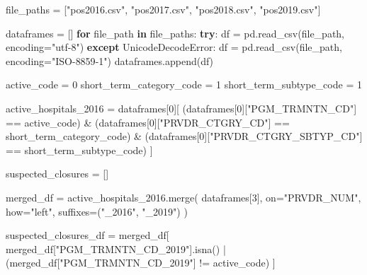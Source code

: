 \documentclass[
  letterpaper,
  DIV=11,
  numbers=noendperiod]{scrartcl}
\newenvironment{Shaded}{\begin{snugshade}}{\end{snugshade}}
\newcommand{\ControlFlowTok}[1]{\textcolor[rgb]{0.00,0.23,0.31}{\textbf{#1}}}
\newcommand{\DecValTok}[1]{\textcolor[rgb]{0.68,0.00,0.00}{#1}}
\newcommand{\KeywordTok}[1]{\textcolor[rgb]{0.00,0.23,0.31}{\textbf{#1}}}
\newcommand{\NormalTok}[1]{\textcolor[rgb]{0.00,0.23,0.31}{#1}}
\newcommand{\OperatorTok}[1]{\textcolor[rgb]{0.37,0.37,0.37}{#1}}
\newcommand{\PreprocessorTok}[1]{\textcolor[rgb]{0.68,0.00,0.00}{#1}}
\newcommand{\StringTok}[1]{\textcolor[rgb]{0.13,0.47,0.30}{#1}}
\begin{document}
\begin{Shaded}
\begin{Highlighting}[]
\NormalTok{file\_paths }\OperatorTok{=}\NormalTok{ [}\StringTok{"pos2016.csv"}\NormalTok{, }\StringTok{"pos2017.csv"}\NormalTok{, }\StringTok{"pos2018.csv"}\NormalTok{, }\StringTok{"pos2019.csv"}\NormalTok{]}

\NormalTok{dataframes }\OperatorTok{=}\NormalTok{ []}
\ControlFlowTok{for}\NormalTok{ file\_path }\KeywordTok{in}\NormalTok{ file\_paths:}
    \ControlFlowTok{try}\NormalTok{:}
\NormalTok{        df }\OperatorTok{=}\NormalTok{ pd.read\_csv(file\_path, encoding}\OperatorTok{=}\StringTok{"utf{-}8"}\NormalTok{)}
    \ControlFlowTok{except} \PreprocessorTok{UnicodeDecodeError}\NormalTok{:}
\NormalTok{        df }\OperatorTok{=}\NormalTok{ pd.read\_csv(file\_path, encoding}\OperatorTok{=}\StringTok{"ISO{-}8859{-}1"}\NormalTok{)}
\NormalTok{    dataframes.append(df)}

\NormalTok{active\_code }\OperatorTok{=} \DecValTok{0}
\NormalTok{short\_term\_category\_code }\OperatorTok{=} \DecValTok{1}
\NormalTok{short\_term\_subtype\_code }\OperatorTok{=} \DecValTok{1}

\NormalTok{active\_hospitals\_2016 }\OperatorTok{=}\NormalTok{ dataframes[}\DecValTok{0}\NormalTok{][}
\NormalTok{    (dataframes[}\DecValTok{0}\NormalTok{][}\StringTok{"PGM\_TRMNTN\_CD"}\NormalTok{] }\OperatorTok{==}\NormalTok{ active\_code)}
    \OperatorTok{\&}\NormalTok{ (dataframes[}\DecValTok{0}\NormalTok{][}\StringTok{"PRVDR\_CTGRY\_CD"}\NormalTok{] }\OperatorTok{==}\NormalTok{ short\_term\_category\_code)}
    \OperatorTok{\&}\NormalTok{ (dataframes[}\DecValTok{0}\NormalTok{][}\StringTok{"PRVDR\_CTGRY\_SBTYP\_CD"}\NormalTok{] }\OperatorTok{==}\NormalTok{ short\_term\_subtype\_code)}
\NormalTok{]}

\NormalTok{suspected\_closures }\OperatorTok{=}\NormalTok{ []}

\NormalTok{merged\_df }\OperatorTok{=}\NormalTok{ active\_hospitals\_2016.merge(}
\NormalTok{    dataframes[}\DecValTok{3}\NormalTok{], on}\OperatorTok{=}\StringTok{"PRVDR\_NUM"}\NormalTok{, how}\OperatorTok{=}\StringTok{"left"}\NormalTok{, suffixes}\OperatorTok{=}\NormalTok{(}\StringTok{"\_2016"}\NormalTok{, }\StringTok{"\_2019"}\NormalTok{)}
\NormalTok{)}

\NormalTok{suspected\_closures\_df }\OperatorTok{=}\NormalTok{ merged\_df[}
\NormalTok{    merged\_df[}\StringTok{"PGM\_TRMNTN\_CD\_2019"}\NormalTok{].isna()}
    \OperatorTok{|}\NormalTok{ (merged\_df[}\StringTok{"PGM\_TRMNTN\_CD\_2019"}\NormalTok{] }\OperatorTok{!=}\NormalTok{ active\_code)}
\NormalTok{]}


\end{Highlighting}
\end{Shaded}
\end{document}
